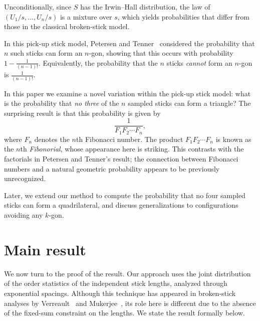 \documentclass{amsart}
\begin{document}
Unconditionally, since $S$ has the Irwin--Hall distribution, the law of $(U_1/s,\dots,U_n/s)$ is a mixture over $s$, which yields probabilities that differ from those in the classical broken-stick model.

In this pick-up stick model, Petersen and Tenner~\cite{petersen} considered the probability that $n$ such sticks can form an $n$-gon, showing that this occurs with probability $1-\frac{1}{(n-1)!}$. Equivalently, the probability that the $n$ sticks \emph{cannot} form an $n$-gon is $\frac{1}{(n-1)!}$.

In this paper we examine a novel variation within the pick-up stick model: what is the probability that \emph{no three} of the $n$ sampled sticks can form a triangle? The surprising result is that this probability is given by
\[
  \frac{1}{F_1F_2\cdots F_n},
\]
where $F_n$ denotes the $n$th Fibonacci number. The product $F_1 F_2 \cdots F_n$ is known as the $n$th \emph{Fibonorial}, whose appearance here is striking. This contrasts with the factorials in Petersen and Tenner's result; the connection between Fibonacci numbers and a natural geometric probability appears to be previously unrecognized.

Later, we extend our method to compute the probability that no four sampled sticks can form a quadrilateral, and discuss generalizations to configurations avoiding any $k$-gon.

\section{Main result}

We now turn to the proof of the result. Our approach uses the joint distribution of the order statistics of the independent stick lengths, analyzed through exponential spacings. Although this technique has appeared in broken-stick analyses by Verreault~\cite{verreault2022a} and Mukerjee~\cite{mukerjee2024}, its role here is different due to the absence of the fixed-sum constraint on the lengths. We state the result formally below.
\end{document}
